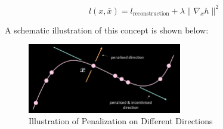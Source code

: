 $$l(x,\bar{x}) = l_{\text{reconstruction}} + \lambda \| \nabla_x h \|^2$$

A schematic illustration of this concept is shown below: 

\begin{figure}[htb]
    \centering
    \includegraphics[width=0.6\textwidth]{labs/09/images/Contractive_AutoEncoder.png}
    \caption{Illustration of Penalization on Different Directions}
    \label{fig:Contractive_AutoEncoder}
\end{figure}
\\


